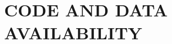 \documentclass[a4paper,12pt,twoside]{report}
\begin{document}

\appendix
\renewcommand{\thesection}{\Roman{section}}
%
\label{chap:app}%

% 

\chapter{CODE AND DATA AVAILABILITY}
\label{app:implementation}

\end{document}
